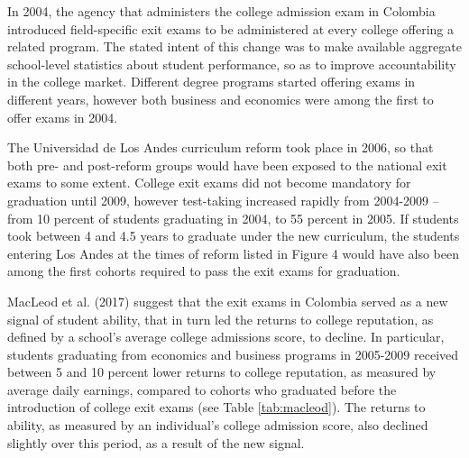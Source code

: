 \documentclass[a4paper, 11pt]{article}
\begin{document}
In 2004, the agency that administers the college admission exam in Colombia introduced field-specific exit exams to be administered at every college offering a related program.  The stated intent of this change was to make available aggregate school-level statistics about student performance, so as to improve accountability in the college market.  Different degree programs started offering exams in different years, however both business and economics were among the first to offer exams in 2004. 

The Universidad de Los Andes curriculum reform took place in 2006, so that both pre- and post-reform groups would have been exposed to the national exit exams to some extent.  College exit exams did not become mandatory for graduation until 2009, however test-taking increased rapidly from 2004-2009 -- from 10 percent of students graduating in 2004, to 55 percent in 2005.  If students took between 4 and 4.5 years to graduate under the new curriculum, the students entering Los Andes at the times of reform listed in Figure 4 would have also been among the first cohorts required to pass the exit exams for graduation. 

MacLeod et al. (2017) suggest that the exit exams in Colombia served as a new signal of student ability, that in turn led the returns to college reputation, as defined by a school's average college admissions score, to decline.  In particular, students graduating from economics and business programs in 2005-2009 received between 5 and 10 percent lower returns to college reputation, as measured by average daily earnings, compared to cohorts who graduated before the introduction of college exit exams (see Table \ref{tab:macleod}).  The returns to ability, as measured by an individual's college admission score, also declined slightly over this period, as a result of the new signal. 
\end{document}
